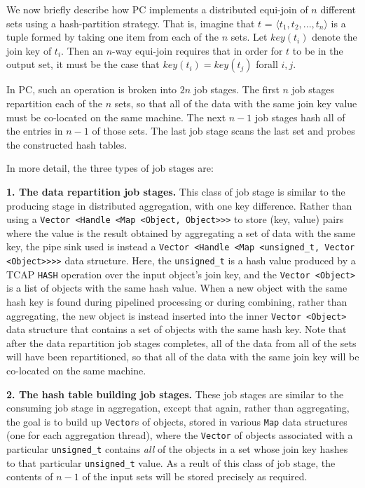 We now briefly describe how PC implements a distributed equi-join of $n$ different sets using a hash-partition strategy.  
That is, imagine that $t$ = $\langle t_1, t_2, ..., t_n \rangle$ is a
tuple formed by taking one item from each of the $n$ sets.  Let $key(t_i)$ denote the join key of $t_i$.  Then an $n$-way equi-join requires that
in order for $t$ to be in the output set, it must be the case that
$key(t_i) = key(t_j)$ forall $i, j$. 

In PC, such an operation is broken into $2n$ job stages. The first $n$ job stages repartition each of the $n$ sets, so that all of the data with the same join key value
must be co-located on the same machine.  The next $n - 1$ job stages hash all of the entries in $n - 1$ of those sets.  The last job stage scans the last set and
probes the constructed hash tables.  

In more detail, the three types of job stages are:

\vspace{5pt}
{\bf 1. The data repartition job stages.} This class of job stage is similar to the producing stage in distributed
aggregation, with one key difference.
Rather than using a \texttt{Vector <Handle <Map <Object, Object>>>} to store (key, value) pairs where the value is the result obtained by aggregating a set of
data with the same key, the pipe sink used is instead a \texttt{Vector <Handle <Map <unsigned\_t, Vector <Object>>>>} data structure.  Here, the
\texttt{unsigned\_t} is a hash value produced by a TCAP \texttt{HASH} operation over the input object's join key, and the \texttt{Vector <Object>} is a list of objects
with the same hash value.  
When a new object with the same hash key is found during pipelined processing or during combining, rather than aggregating, the new object is instead inserted
into the inner \texttt{Vector <Object>} data structure that contains a set of objects with the same hash key.
Note that after the data repartition job stages completes, all of the data from all of the sets will have been repartitioned, so that all of the data with the same join
key will be co-located on the same machine.

\vspace{5pt}
{\bf 2. The hash table building job stages.} These job stages are similar to the consuming job stage in aggregation, 
except that again, rather than aggregating, the goal is to build up \texttt{Vector}s of objects, stored in various \texttt{Map} data structures (one for each
aggregation thread), where the \texttt{Vector} of objects associated with a particular 
\texttt{unsigned\_t} contains \emph{all} of the objects in a set whose join key hashes to that particular \texttt{unsigned\_t} value.
As a reult of this class of job stage, the contents of $n - 1$ of the input sets will be stored precisely as required.

